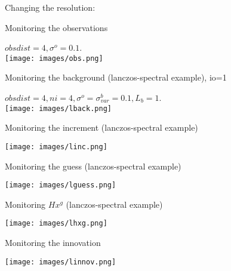 \documentclass[francais]{beamer}
\begin{document}
\begin{frame}
\begin{center}
\huge{Changing the resolution}:
\end{center}
\end{frame}

\begin{frame}{Monitoring the observations}
\begin{center}
$obsdist=4,\sigma^o=0.1$.\\
 \texttt{[image: images/obs.png]}
\end{center}
\end{frame}
\begin{frame}{Monitoring the background (lanczos-spectral example), io=1}
\begin{center}
$obsdist=4, ni=4, \sigma^o=\sigma^b_{var}=0.1, L_b=1$.\\
 \texttt{[image: images/lback.png]}
\end{center}
\end{frame}

\begin{frame}{Monitoring the increment (lanczos-spectral example)}
\begin{center}
 \texttt{[image: images/linc.png]}
\end{center}
\end{frame}
\begin{frame}{Monitoring the guess (lanczos-spectral example)}
\begin{center}
 \texttt{[image: images/lguess.png]}
\end{center}
\end{frame}
\begin{frame}{Monitoring $H x^g$ (lanczos-spectral example)}
\begin{center}
 \texttt{[image: images/lhxg.png]}
\end{center}
\end{frame}
\begin{frame}{Monitoring the innovation}
\begin{center}
 \texttt{[image: images/linnov.png]}
\end{center}
\end{frame}
\end{document}

